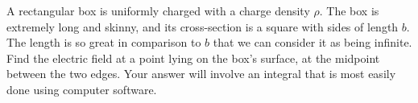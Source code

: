 A rectangular box is uniformly charged with a charge density $\rho$.
The box is extremely long and skinny, and its cross-section is a square
with sides of length $b$. The length is so great in comparison to
$b$ that we can consider it as being infinite. Find the electric field at a
point lying on the box's surface, at the midpoint between the two edges.
Your answer will involve an integral that is most easily done using computer
software.
